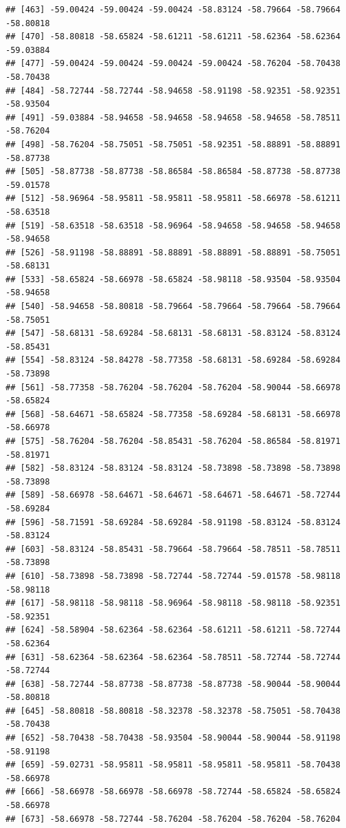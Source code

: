 \documentclass[
]{article}
\begin{document}
\begin{verbatim}
## [463] -59.00424 -59.00424 -59.00424 -58.83124 -58.79664 -58.79664 -58.80818
## [470] -58.80818 -58.65824 -58.61211 -58.61211 -58.62364 -58.62364 -59.03884
## [477] -59.00424 -59.00424 -59.00424 -59.00424 -58.76204 -58.70438 -58.70438
## [484] -58.72744 -58.72744 -58.94658 -58.91198 -58.92351 -58.92351 -58.93504
## [491] -59.03884 -58.94658 -58.94658 -58.94658 -58.94658 -58.78511 -58.76204
## [498] -58.76204 -58.75051 -58.75051 -58.92351 -58.88891 -58.88891 -58.87738
## [505] -58.87738 -58.87738 -58.86584 -58.86584 -58.87738 -58.87738 -59.01578
## [512] -58.96964 -58.95811 -58.95811 -58.95811 -58.66978 -58.61211 -58.63518
## [519] -58.63518 -58.63518 -58.96964 -58.94658 -58.94658 -58.94658 -58.94658
## [526] -58.91198 -58.88891 -58.88891 -58.88891 -58.88891 -58.75051 -58.68131
## [533] -58.65824 -58.66978 -58.65824 -58.98118 -58.93504 -58.93504 -58.94658
## [540] -58.94658 -58.80818 -58.79664 -58.79664 -58.79664 -58.79664 -58.75051
## [547] -58.68131 -58.69284 -58.68131 -58.68131 -58.83124 -58.83124 -58.85431
## [554] -58.83124 -58.84278 -58.77358 -58.68131 -58.69284 -58.69284 -58.73898
## [561] -58.77358 -58.76204 -58.76204 -58.76204 -58.90044 -58.66978 -58.65824
## [568] -58.64671 -58.65824 -58.77358 -58.69284 -58.68131 -58.66978 -58.66978
## [575] -58.76204 -58.76204 -58.85431 -58.76204 -58.86584 -58.81971 -58.81971
## [582] -58.83124 -58.83124 -58.83124 -58.73898 -58.73898 -58.73898 -58.73898
## [589] -58.66978 -58.64671 -58.64671 -58.64671 -58.64671 -58.72744 -58.69284
## [596] -58.71591 -58.69284 -58.69284 -58.91198 -58.83124 -58.83124 -58.83124
## [603] -58.83124 -58.85431 -58.79664 -58.79664 -58.78511 -58.78511 -58.73898
## [610] -58.73898 -58.73898 -58.72744 -58.72744 -59.01578 -58.98118 -58.98118
## [617] -58.98118 -58.98118 -58.96964 -58.98118 -58.98118 -58.92351 -58.92351
## [624] -58.58904 -58.62364 -58.62364 -58.61211 -58.61211 -58.72744 -58.62364
## [631] -58.62364 -58.62364 -58.62364 -58.78511 -58.72744 -58.72744 -58.72744
## [638] -58.72744 -58.87738 -58.87738 -58.87738 -58.90044 -58.90044 -58.80818
## [645] -58.80818 -58.80818 -58.32378 -58.32378 -58.75051 -58.70438 -58.70438
## [652] -58.70438 -58.70438 -58.93504 -58.90044 -58.90044 -58.91198 -58.91198
## [659] -59.02731 -58.95811 -58.95811 -58.95811 -58.95811 -58.70438 -58.66978
## [666] -58.66978 -58.66978 -58.66978 -58.72744 -58.65824 -58.65824 -58.66978
## [673] -58.66978 -58.72744 -58.76204 -58.76204 -58.76204 -58.76204
\end{verbatim}
\end{document}
